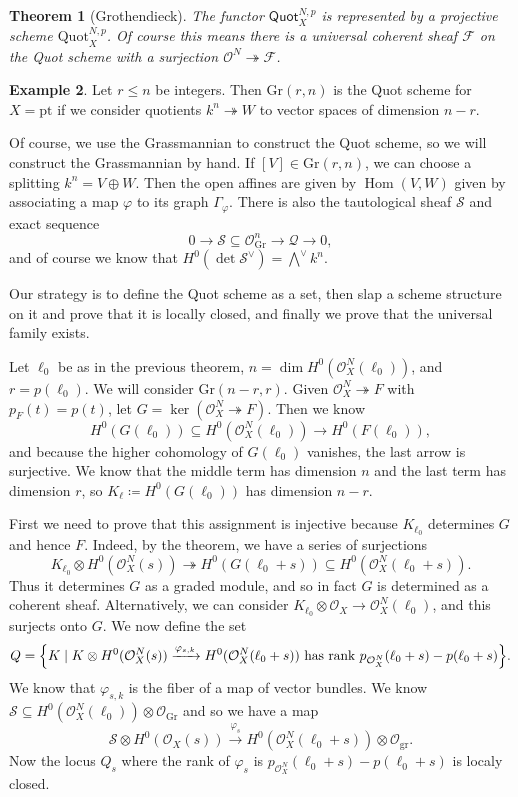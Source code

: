 \documentclass[leqno, openany]{memoir}
\newtheorem{thm}{Theorem}[section]
\theoremstyle{definition}
\newtheorem{exm}[thm]{Example}
\theoremstyle{remark}
\theoremstyle{plain}
\theoremstyle{definition}
\theoremstyle{remark}
\newcommand{\mc}[1]{\mathcal{#1}}
\newcommand{\mr}[1]{\mathrm{#1}}
\newcommand{\ms}[1]{\mathsf{#1}}
\DeclareMathOperator{\Hom}{Hom}
\begin{document}
\begin{thm}[Grothendieck]
    The functor $\ms{Quot}_X^{N, p}$ is represented by a projective scheme $\mr{Quot}_X^{N, p}$. Of course this means there is a universal coherent sheaf $\mc{F}$ on the Quot scheme with a surjection $\mc{O}^N \twoheadrightarrow \mc{F}$.
\end{thm}

\begin{exm}
    Let $r \leq n$ be integers. Then $\mr{Gr}(r, n)$ is the Quot scheme for $X = \mr{pt}$ if we consider quotients $k^n \twoheadrightarrow W$ to vector spaces of dimension $n-r$.
\end{exm}

Of course, we use the Grassmannian to construct the Quot scheme, so we will construct the Grassmannian by hand. If $[V] \in \mr{Gr}(r, n)$, we can choose a splitting $k^n = V \oplus W$. Then the open affines are given by $\Hom(V, W)$ given by associating a map $\varphi$ to its graph $\Gamma_{\varphi}$. There is also the tautological sheaf $\mc{S}$ and exact sequence
\[ 0 \to \mc{S} \subseteq \mc{O}_{\mr{Gr}}^n \to \mc{Q} \to 0, \]
and of course we know that $H^0(\det \mc{S}^{\vee}) = \bigwedge^{\vee} k^n$.

Our strategy is to define the Quot scheme as a set, then slap a scheme structure on it and prove that it is locally closed, and finally we prove that the universal family exists.

Let $\ell_0$ be as in the previous theorem, $n = \dim H^0(\mc{O}_X^N(\ell_0))$, and $r = p(\ell_0)$. We will consider $\mr{Gr}(n-r, r)$. Given $\mc{O}_X^N \twoheadrightarrow F$ with $p_F(t) = p(t)$, let $G = \ker(\mc{O}_X^N \twoheadrightarrow F)$. Then we know
\[ H^0(G(\ell_0)) \subseteq H^0(\mc{O}_X^N(\ell_0)) \to H^0(F(\ell_0)), \]
and because the higher cohomology of $G(\ell_0)$ vanishes, the last arrow is surjective. We know that the middle term has dimension $n$ and the last term has dimension $r$, so $K_{\ell} \coloneqq H^0(G(\ell_0))$ has dimension $n-r$.

First we need to prove that this assignment is injective because $K_{\ell_0}$ determines $G$ and hence $F$. Indeed, by the theorem, we have a series of surjections
\[ K_{\ell_0} \otimes H^0(\mc{O}_X^N(s)) \twoheadrightarrow H^0(G(\ell_0 + s)) \subseteq H^0(\mc{O}_X^N(\ell_0 + s)). \]
Thus it determines $G$ as a graded module, and so in fact $G$ is determined as a coherent sheaf. Alternatively, we can consider $K_{\ell_0} \otimes \mc{O}_X \to \mc{O}_X^N(\ell_0)$, and this surjects onto $G$. We now define the set
\[ Q = \qty{K \mid K \otimes H^0(\mc{O}_X^N(s)) \xrightarrow{\varphi_{s,k}} H^0(\mc{O}_X^N(\ell_0 + s)) \text{ has rank } p_{\mc{O}_X^N}(\ell_0 + s) - p(\ell_0 + s)}. \]
We know that $\varphi_{s, k}$ is the fiber of a map of vector bundles. We know $\mc{S} \subseteq H^0(\mc{O}_X^N(\ell_0)) \otimes \mc{O}_{\mr{Gr}}$ and so we have a map
\[ \mc{S} \otimes H^0(\mc{O}_X(s)) \xrightarrow{\varphi_s} H^0(\mc{O}_X^N(\ell_0 + s)) \otimes \mc{O}_{\mr{gr}}. \]
Now the locus $Q_s$ where the rank of $\varphi_s$ is $p_{\mc{O}_X^N}(\ell_0 + s) - p(\ell_0 + s)$ is localy closed.
\end{document}
